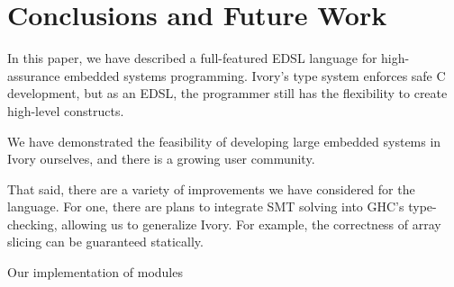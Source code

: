 \section{Conclusions and Future Work}
\label{sec:conclusion}

In this paper, we have described a full-featured EDSL language for
high-assurance embedded systems programming. Ivory's type system enforces safe C
development, but as an EDSL, the programmer still has the flexibility to create
high-level constructs.

We have demonstrated the feasibility of developing large embedded systems in
Ivory ourselves, and there is a growing user community.

That said, there are a variety of improvements we have considered for the
language. For one, there are plans to integrate SMT solving into GHC's
type-checking, allowing us to generalize Ivory. For example, the correctness of
array slicing can be guaranteed statically.

Our implementation of modules



